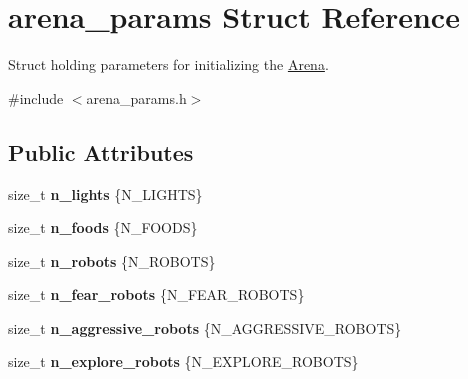 \hypertarget{structarena__params}{}\section{arena\+\_\+params Struct Reference}
\label{structarena__params}


Struct holding parameters for initializing the \hyperlink{classArena}{Arena}.  




{\ttfamily \#include $<$arena\+\_\+params.\+h$>$}

\subsection*{Public Attributes}
\begin{DoxyCompactItemize}
\item 
size\+\_\+t {\bfseries n\+\_\+lights} \{N\+\_\+\+L\+I\+G\+H\+TS\}\hypertarget{structarena__params_a98012558dd0075a9f0df9f38140c5bbd}{}\label{structarena__params_a98012558dd0075a9f0df9f38140c5bbd}

\item 
size\+\_\+t {\bfseries n\+\_\+foods} \{N\+\_\+\+F\+O\+O\+DS\}\hypertarget{structarena__params_a4160066249e38b463e638d0f8478a5c1}{}\label{structarena__params_a4160066249e38b463e638d0f8478a5c1}

\item 
size\+\_\+t {\bfseries n\+\_\+robots} \{N\+\_\+\+R\+O\+B\+O\+TS\}\hypertarget{structarena__params_a6ae235113b4a6870d502c913c65ad9a2}{}\label{structarena__params_a6ae235113b4a6870d502c913c65ad9a2}

\item 
size\+\_\+t {\bfseries n\+\_\+fear\+\_\+robots} \{N\+\_\+\+F\+E\+A\+R\+\_\+\+R\+O\+B\+O\+TS\}\hypertarget{structarena__params_a09a4ed7453a4323d38fc3a91768b8899}{}\label{structarena__params_a09a4ed7453a4323d38fc3a91768b8899}

\item 
size\+\_\+t {\bfseries n\+\_\+aggressive\+\_\+robots} \{N\+\_\+\+A\+G\+G\+R\+E\+S\+S\+I\+V\+E\+\_\+\+R\+O\+B\+O\+TS\}\hypertarget{structarena__params_aa1d6b7803fd189521ab4ba72267651ab}{}\label{structarena__params_aa1d6b7803fd189521ab4ba72267651ab}

\item 
size\+\_\+t {\bfseries n\+\_\+explore\+\_\+robots} \{N\+\_\+\+E\+X\+P\+L\+O\+R\+E\+\_\+\+R\+O\+B\+O\+TS\}\hypertarget{structarena__params_aa7af4e4c9226608adae807a756c9bcf5}{}\label{structarena__params_aa7af4e4c9226608adae807a756c9bcf5}


\end{DoxyCompactItemize}
